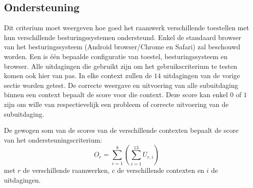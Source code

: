 \subsection{Ondersteuning}
\label{sec:vergelijking-ondersteuning}
Dit criterium moet weergeven hoe goed het raamwerk verschillende toestellen met hun verschillende besturingssystemen ondersteund.
Enkel de standaard browser van het besturingssysteem (Android browser/Chrome en Safari) zal beschouwd worden.
Een  is één bepaalde configuratie van toestel, besturingssysteem en browser.
Alle uitdagingen die gebruikt zijn om het gebruikscriterium te testen komen ook hier van pas.
In elke context zullen de $14$ uitdagingen van de vorige sectie worden getest.
De correcte weergave en uitvoering van alle subuitdaging binnen een context bepaalt de score voor die context.
Deze score kan enkel $0$ of $1$ zijn om wille van respectievelijk een probleem of correcte uitvoering van de subuitdaging.
% 

De gewogen som van de scores van de verschillende contexten bepaalt de score van het ondersteuningscriterium:
\begin{equation}
  O_r = \sum_{c=1}^{8}{\left(\sum_{i=1}^{13}U_{r,i}\right)}
  \label{eq:ondersteuning}
\end{equation}
met $r$ de verschillende raamwerken,  $c$ de verschillende contexten en $i$ de uitdagingen. 

